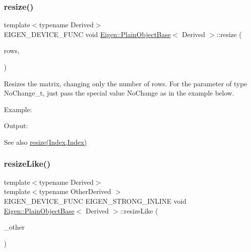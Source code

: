 \subsubsection{\texorpdfstring{resize()}{resize()}\hspace{0.1cm}{\footnotesize\ttfamily [4/4]}}
{\footnotesize\ttfamily template$<$typename Derived$>$ \\
E\+I\+G\+E\+N\+\_\+\+D\+E\+V\+I\+C\+E\+\_\+\+F\+U\+NC void \mbox{\hyperlink{class_eigen_1_1_plain_object_base}{Eigen\+::\+Plain\+Object\+Base}}$<$ Derived $>$\+::resize (\begin{DoxyParamCaption}\item[{Index}]{rows,  }\item[{No\+Change\+\_\+t}]{ }\end{DoxyParamCaption})\hspace{0.3cm}{\ttfamily [inline]}}

Resizes the matrix, changing only the number of rows. For the parameter of type No\+Change\+\_\+t, just pass the special value {\ttfamily No\+Change} as in the example below.

Example\+: 
\begin{DoxyCodeInclude}{0}
\end{DoxyCodeInclude}
 Output\+: 
\begin{DoxyVerbInclude}
\end{DoxyVerbInclude}


\begin{DoxySeeAlso}{See also}
\mbox{\hyperlink{class_eigen_1_1_plain_object_base_a99d9054ee2d5a40c6e00ded0265e9cea}{resize(\+Index,\+Index)}} 
\end{DoxySeeAlso}
\mbox{\label{class_eigen_1_1_plain_object_base_acc7200947e6399bee847ff37c8270fc8}} 
\subsubsection{\texorpdfstring{resizeLike()}{resizeLike()}}
{\footnotesize\ttfamily template$<$typename Derived$>$ \\
template$<$typename Other\+Derived $>$ \\
E\+I\+G\+E\+N\+\_\+\+D\+E\+V\+I\+C\+E\+\_\+\+F\+U\+NC E\+I\+G\+E\+N\+\_\+\+S\+T\+R\+O\+N\+G\+\_\+\+I\+N\+L\+I\+NE void \mbox{\hyperlink{class_eigen_1_1_plain_object_base}{Eigen\+::\+Plain\+Object\+Base}}$<$ Derived $>$\+::resize\+Like (\begin{DoxyParamCaption}\item[{const \mbox{\hyperlink{struct_eigen_1_1_eigen_base}{Eigen\+Base}}$<$ Other\+Derived $>$ \&}]{\+\_\+other }\end{DoxyParamCaption})\hspace{0.3cm}{\ttfamily [inline]}}

